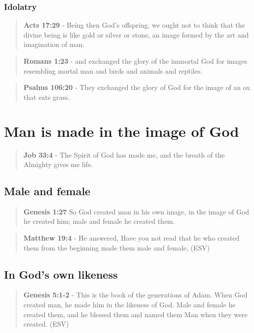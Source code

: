 \documentclass[11pt]{article}
\begin{document}
\subsubsection{Idolatry}
\label{sec:orgf86501c}

\begin{quote}
\textbf{Acts 17:29} - Being then God's offspring, we ought not to think that the divine being is like gold or silver or stone, an image formed by the art and imagination of man.
\end{quote}

\begin{quote}
\textbf{Romans 1:23} - and exchanged the glory of the immortal God for images resembling mortal man and birds and animals and reptiles.􄐺
\end{quote}

\begin{quote}
\textbf{Psalms 106:20} - They exchanged the glory of God for the image of an ox that eats grass.􂉢
\end{quote}

\section{Man is made in the image of God}
\label{sec:org154f1da}
\begin{quote}
\textbf{Job 33:4} - The Spirit of God has made me, and the breath of the Almighty gives me life.
\end{quote}

\subsection{Male and female}
\label{sec:orgf89cc2c}
\begin{quote}
\textbf{Genesis 1:27} So God created man in his own image, in the image of God he created him; male and female he created them.
\end{quote}

\begin{quote}
\textbf{Matthew 19:4} - He answered, Have you not read that he who created them from the beginning made them male and female, (ESV)
\end{quote}

\subsection{In God's own likeness}
\label{sec:org1f7bed9}
\begin{quote}
\textbf{Genesis 5:1-2} -  This is the book of the generations of Adam.  When God created man, he made him in the likeness of God.  Male and female he created them, and he blessed them and named them Man when they were created.  (ESV)
\end{quote}
\end{document}
